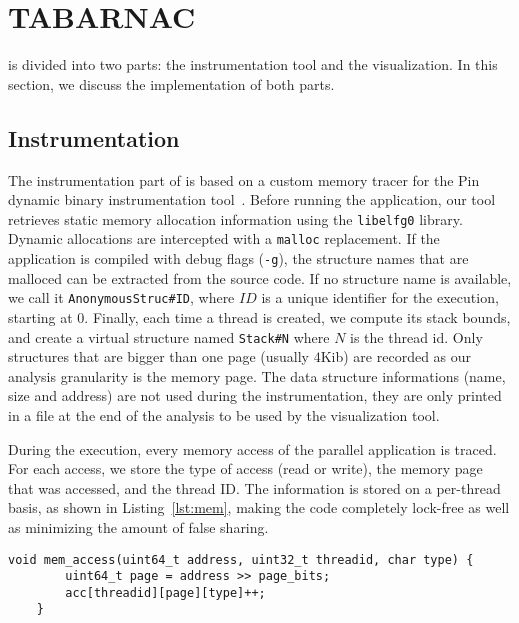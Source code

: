 
\section{TABARNAC}
\label{sec:design}

\TABARNAC is divided into two parts: the instrumentation tool and the
visualization. In this section, we discuss the implementation of both parts.

\subsection{Instrumentation}
\label{sec:design-impl}

The instrumentation part of \TABARNAC is based on a custom memory tracer for the Pin dynamic binary instrumentation tool~\cite{Luk05Pin}.
Before running the application, our tool retrieves static memory allocation
information using the \texttt{libelfg0} library. Dynamic allocations are
intercepted with a \texttt{malloc} replacement. If the application is
compiled with debug flags (\texttt{-g}), the structure names that are malloced can be extracted from the source
code. If no structure name is available, we call it
\texttt{AnonymousStruc\#ID}, where $ID$ is a unique identifier for the
execution, starting at $0$. Finally, each time a thread is created, we compute
its stack bounds, and create a virtual structure named \texttt{Stack\#N} where
$N$ is the thread id. Only structures that are bigger than one page (usually
$4$Kib) are recorded as our
analysis granularity is the memory page. The data structure informations (name,
size and address) are not used during the instrumentation, they are only
printed in a file at the end of the analysis to be used by the visualization
tool.

During the execution, every memory access of the parallel application is traced.
For each access, we store the type of access (read or write), the memory page that was accessed, and the thread ID.
The information is stored on a per-thread basis, as shown in
Listing~\ref{lst:mem}, making the code completely lock-free as well as minimizing the amount of false sharing.

\begin{lstlisting}[caption={Code executed on each memory access. The \texttt{address}, \texttt{threadid} and \texttt{type} parameters are from Pin.},label=lst:mem]
	void mem_access(uint64_t address, uint32_t threadid, char type) {
		uint64_t page = address >> page_bits;
		acc[threadid][page][type]++;
	}

\end{lstlisting}


